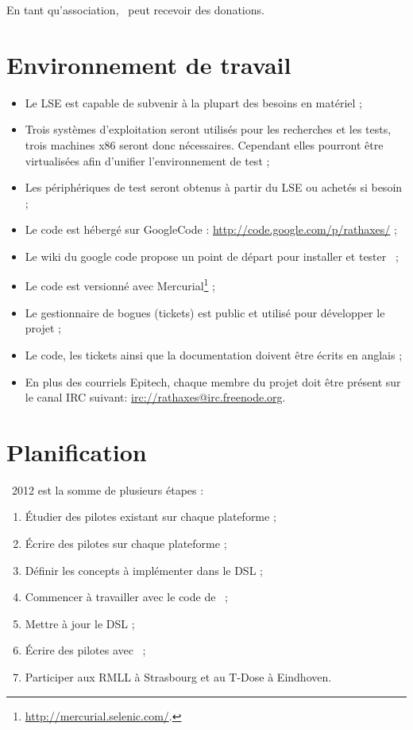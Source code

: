 \documentclass[chapterprefix=off]{rtxreport}
\begin{document}
En tant qu'association, \rtx\ peut recevoir des donations.

\section{Environnement de travail}

\begin{itemize}
\item Le LSE est capable de subvenir à la plupart des besoins en matériel ;
\item Trois systèmes d'exploitation seront utilisés pour les recherches et les
tests, trois machines x86 seront donc nécessaires. Cependant elles pourront
être virtualisées afin d'unifier l'environnement de test ;
\item Les périphériques de test seront obtenus à partir du LSE ou achetés si
besoin ;
\item Le code est hébergé sur GoogleCode : \url{http://code.google.com/p/rathaxes/} ;
\item Le wiki du google code propose un point de départ pour installer et
tester \rtx\ ;
\item Le code est versionné avec
Mercurial\footnote{\url{http://mercurial.selenic.com/}.} ;
\item Le gestionnaire de bogues (tickets) est public et utilisé pour développer
le projet ;
\item Le code, les tickets ainsi que la documentation doivent être écrits en
anglais ;
\item En plus des courriels Epitech, chaque membre du projet doit être présent
sur le canal IRC suivant: \url{irc://rathaxes@irc.freenode.org}.
\end{itemize}

\section{Planification}

\rtx\ 2012 est la somme de plusieurs étapes :

\begin{enumerate}
\item Étudier des pilotes existant sur chaque plateforme ;
\item Écrire des pilotes sur chaque plateforme ;
\item Définir les concepts à implémenter dans le DSL ;
\item Commencer à travailler avec le code de \rtx\ ;
\item Mettre à jour le DSL ;
\item Écrire des pilotes avec \rtx\ ;
\item Participer aux RMLL à Strasbourg et au T-Dose à Eindhoven.
\end{enumerate}
\end{document}

